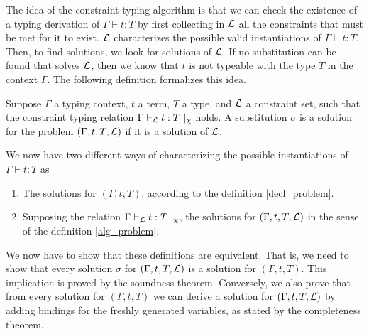 The idea of the constraint typing algorithm is that we can check the existence of a typing derivation of $\Gamma \vdash t : T$ by first
collecting in $\mathcal{L}$ all the constraints that must be met for it to exist. $\mathcal{L}$ characterizes the possible valid instantiations of
$\Gamma \vdash t : T$. Then, to find solutions, we look for solutions of $\mathcal{L}$. If no substitution can be found that solves $\mathcal{L}$,
then we know that $t$ is not typeable with the type $T$ in the context $\Gamma$. The following definition formalizes this idea.

\begin{defn}
	\label{alg_problem}
	Suppose $\Gamma$ a typing context, $t$ a term, $T$ a type, and $\mathcal{L}$ a constraint set, such that the constraint typing relation
	$\Gamma \vdash_{\mathcal{L}} t : T ~|_\chi$ holds.
	A substitution $\sigma$ is a solution for the problem 	$(\Gamma, t, T, \mathcal{L})$ if it is a solution of $\mathcal{L}$.
\end{defn}

We now have two different ways of characterizing the possible instantiations of $\Gamma \vdash t : T$ as
 	\begin{enumerate}
 		\item The solutions for $(\Gamma, t, T)$, according to the definition \ref{decl_problem}.
 		\item Supposing the relation $\Gamma \vdash_{\mathcal{L}} t : T ~|_\chi$, the solutions for $(\Gamma, t, T, \mathcal{L})$ in the sense of the definition
 			\ref{alg_problem}.
 	\end{enumerate}

We now have to show that these definitions are equivalent. That is, we need to show that every solution $\sigma$ for $(\Gamma, t, T, \mathcal{L})$
is a solution for $(\Gamma, t, T)$. This implication is proved by the soundness theorem. Conversely, we also prove that from every solution
for $(\Gamma, t, T)$ we can derive a solution for $(\Gamma, t, T, \mathcal{L})$ by adding bindings for the freshly generated variables, as stated
by the completeness theorem.


